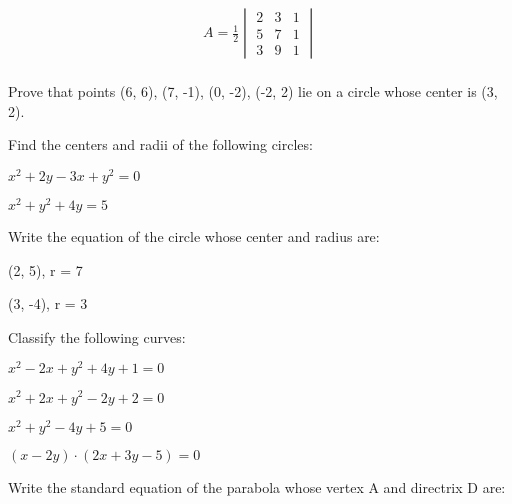 \documentclass[11pt]{amsbook}
\begin{document}

\begin{align*}
	A = \frac{1}{2} 
	\begin{vmatrix} 2 & 3 & 1 \\ 5 & 7 & 1 \\ 3 & 9 & 1 \end{vmatrix}\\
\end{align*}

\begin{hEnumerateArabic}
	\item Prove that points (6, 6), (7, -1), (0, -2), (-2, 2) lie on a circle whose center is (3, 2).\\
	\item Find the centers and radii of the following circles:
		\begin{hEnumerateAlpha} 
			\begin{multicols}{2}
				\item $x^2+2y - 3x + y^2=0$
			\columnbreak
				\item $x^2 + y^2 + 4y =5$
			\end{multicols}
		\end{hEnumerateAlpha}
	\item Write the equation of the circle whose center and radius are:
		\begin{hEnumerateAlpha}
			\begin{multicols}{2}
				\item (2, 5), \: r = 7
			\columnbreak
				\item (3, -4), \:  r = 3
			\end{multicols}
		\end{hEnumerateAlpha}
	\item Classify the following curves:
		\begin{hEnumerateAlpha}
			\begin{multicols}{2}
				\item $x^2 -2x +y^2 + 4y +1 =0$
				\item $x^2 +2x +y^2 -2y +2=0$
			\columnbreak
				\item $x^2 +y^2 - 4y +5 =0$
				\item $(x-2y) \cdot (2x+3y -5)=0$
			\end{multicols}
		\end{hEnumerateAlpha}
	\item Write the standard equation of the parabola whose vertex A and directrix D are:
		\begin{hEnumerateAlpha}

\end{hEnumerateAlpha}
\end{hEnumerateArabic}
\end{document}

